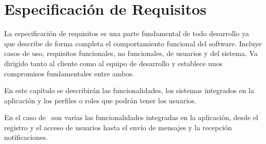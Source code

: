%
%
%
%

\cleardoublepage
\chapter{Especificación de Requisitos}
\label{chap:requirements}

	La especificación de requisitos es una parte fundamental de todo desarrollo ya que describe de forma completa el comportamiento funcional del software. Incluye casos de uso, requisitos funcionales, no funcionales, de usuarios y del sistema.
	Va dirigido tanto al cliente como al equipo de desarrollo y establece unos compromisos fundamentales entre ambos.
	
	\bigskip
	En este capítulo se describirán las funcionalidades, los sistemas integrados en la aplicación y los perfiles o roles que podrán tener los usuarios.
	
	\bigskip
	En el caso de \CollegeApp\ son varias las funcionalidades integradas en la aplicación, desde el registro y el acceso de usuarios hasta el envío de mensajes y la recepción notificaciones.
	
